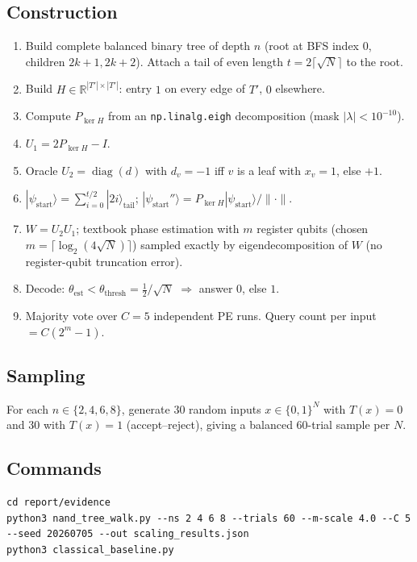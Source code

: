 \documentclass[11pt]{article}
\begin{document}
\subsection{Construction}
\begin{enumerate}
\item Build complete balanced binary tree of depth $n$ (root at BFS index $0$, children $2k+1,2k+2$).
      Attach a tail of even length $t = 2\lceil \sqrt N \rceil$ to the root.
\item Build $H \in \mathbb{R}^{|T'|\times|T'|}$: entry $1$ on every edge of $T'$, $0$ elsewhere.
\item Compute $P_{\ker H}$ from an \texttt{np.linalg.eigh} decomposition (mask $|\lambda|<10^{-10}$).
\item $U_1 = 2 P_{\ker H} - I$.
\item Oracle $U_2 = \operatorname{diag}(d)$ with $d_v = -1$ iff $v$ is a leaf with $x_v = 1$, else $+1$.
\item $|\psi_{\text{start}}\rangle = \sum_{i=0}^{t/2} |2i\rangle_{\text{tail}}$;
      $|\psi_{\text{start}}''\rangle = P_{\ker H} |\psi_{\text{start}}\rangle / \|\cdot\|$.
\item $W = U_2 U_1$; textbook phase estimation with $m$ register qubits (chosen $m = \lceil \log_2(4\sqrt N)\rceil$)
      sampled exactly by eigendecomposition of $W$ (no register-qubit truncation error).
\item Decode: $\theta_{\text{est}} < \theta_{\text{thresh}} = \tfrac12 / \sqrt N$ $\Rightarrow$ answer $0$, else $1$.
\item Majority vote over $C=5$ independent PE runs. Query count per input $= C(2^m - 1)$.
\end{enumerate}

\subsection{Sampling}
For each $n \in \{2,4,6,8\}$, generate 30 random inputs $x \in \{0,1\}^N$ with $T(x)=0$
and 30 with $T(x)=1$ (accept--reject), giving a balanced 60-trial sample per $N$.

\subsection{Commands}
\begin{lstlisting}
cd report/evidence
python3 nand_tree_walk.py --ns 2 4 6 8 --trials 60 --m-scale 4.0 --C 5 --seed 20260705 --out scaling_results.json
python3 classical_baseline.py
\end{lstlisting}
\end{document}
